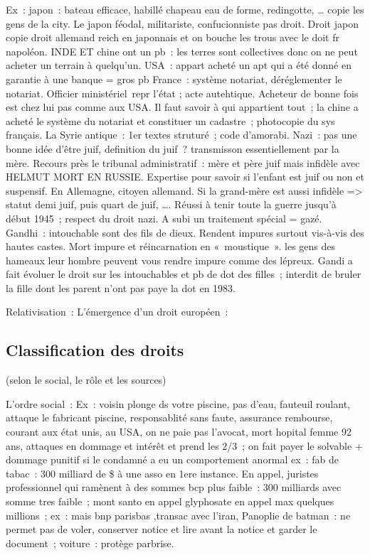 \documentclass[a4paper,12pt]{article}
\begin{document}
Ex : japon : bateau efficace, habillé chapeau eau de forme, redingotte, … copie les gens de la city.
Le japon féodal, militariste, confucionniste pas droit. Droit japon copie droit allemand reich en japonnais et on bouche les trous avec le doit fr napoléon.
INDE ET chine ont un pb : les terres sont collectives donc on ne peut acheter un terrain à quelqu’un.
USA : appart acheté un apt qui a été donné en garantie à une banque = gros pb
France : système notariat, déréglementer le notariat. Officier ministériel repr l’état ; acte autehtique.
Acheteur de bonne fois est chez lui pas comme aux USA.
Il faut savoir à qui appartient tout ; la chine a acheté le système du notariat et constituer un cadastre ; photocopie du sys français. 
La Syrie antique : 1er textes struturé ; code d’amorabi.
Nazi : pas une bonne idée d’être juif, definition du juif ? transmisson essentiellement par la mère.
Recours près le tribunal administratif : mère et père juif mais infidèle avec HELMUT MORT EN RUSSIE. Expertise pour savoir si l’enfant est juif ou non et suspensif. En Allemagne, citoyen allemand.
Si la grand-mère est aussi infidèle => statut demi juif, puis quart de juif, …. Réussi à tenir toute la guerre jusqu’à début 1945 ; respect du droit nazi. A subi un traitement spécial = gazé.
Gandhi : intouchable sont des fils de dieux. Rendent impures surtout vis-à-vis des hautes castes. Mort impure et réincarnation en « moustique ». les gens des hameaux leur hombre peuvent vous rendre impure comme des lépreux. Gandi a fait évoluer le droit sur les intouchables et pb de dot des filles ; interdit de bruler la fille dont les parent n’ont pas paye la dot en 1983. 

Relativisation :
L’émergence d’un droit européen :


\subsection{Classification des droits}
(selon le social, le rôle et les sources)



L’ordre social :
Ex : voisin plonge ds votre piscine, pas d’eau, fauteuil roulant, attaque le fabricant piscine, responsablité sans faute, assurance rembourse, courant aux état unis, au USA, on ne paie pas l’avocat, mort hopital femme 92 ans, attaques en dommage et intérêt et prend les 2/3 ; on fait payer le solvable + dommage punitif si le condamné a eu un comportement anormal ex : fab de tabac : 300 milliard de \$ à une asso en 1ere instance. 
En appel, juristes professionnel qui ramènent à des sommes bcp plus faible : 300 milliards avec somme tres faible ; mont santo en appel glyphosate en appel max quelques millions ; ex : mais bnp parisbas ,transac avec l’iran, 
Panoplie de batman : ne permet pas de voler, conserver notice et lire avant la notice et garder le document ; voiture : protège parbrise.
\end{document}
